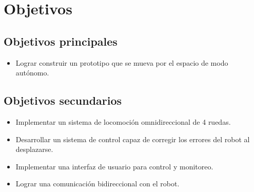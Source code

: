 \chapter{Objetivos}

\section{Objetivos principales}

\begin{itemize}
    \item Lograr construir un prototipo que se mueva por el espacio de modo autónomo.
\end{itemize}


\section{Objetivos secundarios}

\begin{itemize}
    \item Implementar un sistema de locomoción omnidireccional de 4 ruedas.
    \item Desarrollar un sistema de control capaz de corregir los errores del robot al desplazarse.
    \item Implementar una interfaz de usuario para control y monitoreo.
    \item Lograr una comunicación bidireccional con el robot.
\end{itemize}